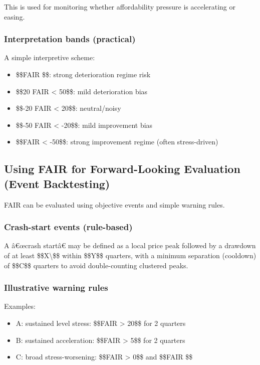 This is used for monitoring whether affordability pressure is
accelerating or easing.

\subsubsection{Interpretation bands
(practical)}\label{interpretation-bands-practical}

A simple interpretive scheme:

\begin{itemize}
\tightlist
\item
  \$\$FAIR \$\$: strong deterioration regime risk
\item
  \$\$20 \le FAIR \textless{} 50\$\$: mild deterioration bias
\item
  \$\$-20 \le FAIR \textless{} 20\$\$: neutral/noisy
\item
  \$\$-50 \le FAIR \textless{} -20\$\$: mild improvement bias
\item
  \$\$FAIR \textless{} -50\$\$: strong improvement regime (often
  stress-driven)
\end{itemize}

\subsection{Using FAIR for Forward-Looking Evaluation (Event
Backtesting)}\label{using-fair-for-forward-looking-evaluation-event-backtesting}

FAIR can be evaluated using objective events and simple warning rules.

\subsubsection{Crash-start events
(rule-based)}\label{crash-start-events-rule-based-1}

A â€œcrash startâ€ may be defined as a local price peak followed by a
drawdown of at least \$\$X\textbackslash\$\$ within \$\$Y\$\$ quarters,
with a minimum separation (cooldown) of \$\$C\$\$ quarters to avoid
double-counting clustered peaks.

\subsubsection{Illustrative warning
rules}\label{illustrative-warning-rules-1}

Examples:

\begin{itemize}
\tightlist
\item
  A: sustained level stress: \$\$FAIR \textgreater{} 20\$\$ for 2
  quarters
\item
  B: sustained acceleration: \$\$\Delta FAIR \textgreater{} 5\$\$ for 2
  quarters
\item
  C: broad stress-worsening: \$\$FAIR \textgreater{} 0\$\$ and
  \$\$\Delta FAIR \$\$
\end{itemize}

